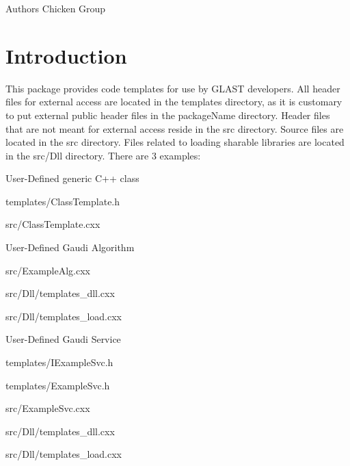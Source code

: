 \begin{DoxyAuthor}{Authors}
Chicken Group
\end{DoxyAuthor}
\hypertarget{index_intro}{}\section{Introduction}\label{index_intro}
This package provides code templates for use by G\-L\-A\-S\-T developers. All header files for external access are located in the templates directory, as it is customary to put external public header files in the package\-Name directory. Header files that are not meant for external access reside in the src directory. Source files are located in the src directory. Files related to loading sharable libraries are located in the src/\-Dll directory. There are 3 examples\-:


\begin{DoxyItemize}
\item User-\/\-Defined generic C++ class
\end{DoxyItemize}
\begin{DoxyEnumerate}
\item templates/\-Class\-Template.\-h
\item src/\-Class\-Template.\-cxx
\end{DoxyEnumerate}
\begin{DoxyItemize}
\item User-\/\-Defined Gaudi Algorithm
\end{DoxyItemize}
\begin{DoxyEnumerate}
\item src/\-Example\-Alg.\-cxx
\item src/\-Dll/templates\-\_\-dll.\-cxx
\item src/\-Dll/templates\-\_\-load.\-cxx
\end{DoxyEnumerate}
\begin{DoxyItemize}
\item User-\/\-Defined Gaudi Service
\end{DoxyItemize}
\begin{DoxyEnumerate}
\item templates/\-I\-Example\-Svc.\-h
\item templates/\-Example\-Svc.\-h
\item src/\-Example\-Svc.\-cxx
\item src/\-Dll/templates\-\_\-dll.\-cxx
\item src/\-Dll/templates\-\_\-load.\-cxx
\end{DoxyEnumerate}

